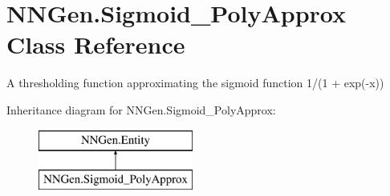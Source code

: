\hypertarget{class_n_n_gen_1_1_sigmoid___poly_approx}{}\section{N\+N\+Gen.\+Sigmoid\+\_\+\+Poly\+Approx Class Reference}
\label{class_n_n_gen_1_1_sigmoid___poly_approx}


A thresholding function approximating the sigmoid function 1/(1 + exp(-\/x))  


Inheritance diagram for N\+N\+Gen.\+Sigmoid\+\_\+\+Poly\+Approx\+:\begin{figure}[H]
\begin{center}
\leavevmode
\includegraphics[height=2.000000cm]{class_n_n_gen_1_1_sigmoid___poly_approx}
\end{center}
\end{figure}
